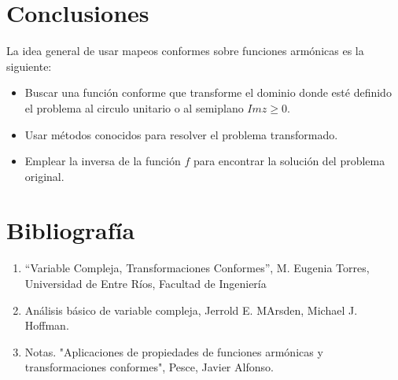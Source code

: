 \documentclass[a4paper]{article}
\begin{document}
\section{Conclusiones}
La idea general de usar mapeos conformes sobre funciones armónicas es la siguiente:
\begin{itemize}
\item Buscar una función conforme que transforme el dominio donde esté definido el problema al circulo unitario o al semiplano $Im z \geq 0.$
\item Usar métodos conocidos para resolver el problema transformado.
\item Emplear la inversa de la función $f$ para encontrar la solución del problema original.
\end{itemize}

\section{Bibliografía}
\begin{enumerate}    
\item
“Variable Compleja, Transformaciones Conformes”, M. Eugenia Torres, Universidad de Entre Ríos, Facultad de Ingeniería
\item
Análisis básico de variable compleja, Jerrold E. MArsden, Michael J. Hoffman.
\item
Notas. "Aplicaciones de propiedades de funciones armónicas y transformaciones conformes", Pesce, Javier Alfonso.
\end{enumerate}
\end{document}
